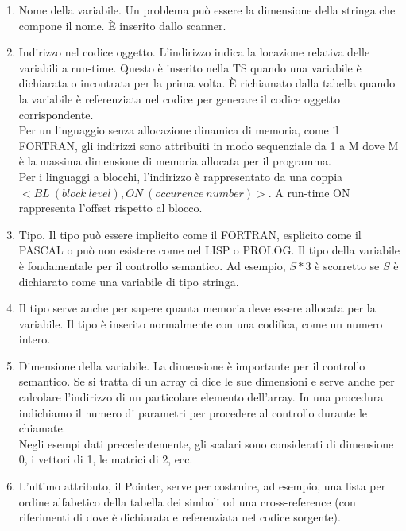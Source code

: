\documentclass[12pt]{report}
\begin{document}
	\begin{enumerate}
		\item Nome della variabile. Un problema può essere la dimensione della stringa che compone il nome. È inserito dallo scanner.
		\item Indirizzo nel codice oggetto. L'indirizzo indica la locazione relativa delle variabili a run-time. Questo è inserito nella TS quando una variabile è dichiarata o incontrata per la prima volta. È richiamato dalla tabella quando la variabile è referenziata nel codice per generare il codice oggetto corrispondente. \\
		Per un linguaggio senza allocazione dinamica di memoria, come il FORTRAN, gli indirizzi sono attribuiti in modo sequenziale da 1 a M dove M è la massima dimensione di memoria allocata per il programma. \\
		Per i linguaggi a blocchi, l'indirizzo è rappresentato da una coppia $<BL\ (block\ level), ON\ (occurence\ number)>$. A run-time ON rappresenta l'offset rispetto al blocco.
		\item Tipo. Il tipo può essere implicito come il FORTRAN, esplicito come il PASCAL o può non esistere come nel LISP o PROLOG. Il tipo della variabile è fondamentale per il controllo semantico. Ad esempio, $S * 3$ è scorretto se $S$ è dichiarato come una variabile di tipo stringa.
		\item Il tipo serve anche per sapere quanta memoria deve essere allocata per la variabile. Il tipo è inserito normalmente con una codifica, come un numero intero.
		\item Dimensione della variabile. La dimensione è importante per il controllo semantico. Se si tratta di un array ci dice le sue dimensioni e serve anche per calcolare l'indirizzo di un particolare elemento dell'array. In una procedura indichiamo il numero di parametri per procedere al controllo durante le chiamate. \\
		Negli esempi dati precedentemente, gli scalari sono considerati di dimensione 0, i vettori di 1, le matrici di 2, ecc.
		\item L'ultimo attributo, il Pointer, serve per costruire, ad esempio, una lista per ordine alfabetico della tabella dei simboli od una cross-reference (con riferimenti di dove è dichiarata e referenziata nel codice sorgente).
	\end{enumerate}
\end{document}
